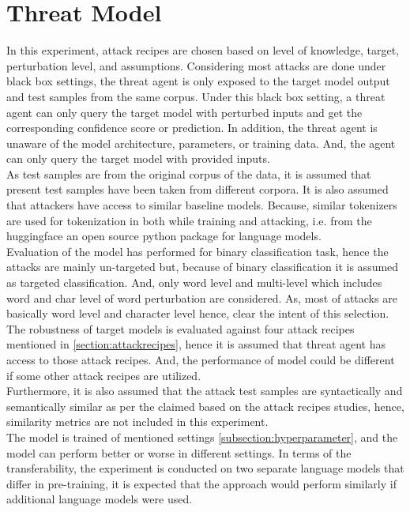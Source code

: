 \documentclass[%
	BCOR=8mm, %
	DIV=12,
	toc=bibliography, %
	toc=listof, %
	oneside, %
	egregdoesnotlikesansseriftitles, %
	]{scrbook}
\begin{document}
\section{Threat Model}
\label{section:threadmodel}
In this experiment, attack recipes are chosen based on level of knowledge, target, perturbation level, and assumptions. Considering most attacks are done under black box settings, the threat agent is only exposed to the target model output and test samples from the same corpus. Under this black box setting, a threat agent can only query the target model with perturbed inputs and get the corresponding confidence score or prediction. In addition, the threat agent is unaware of the model architecture, parameters, or training data. And, the agent can only query the target model with provided inputs. \\
As test samples are from the original corpus of the data, it is assumed that present test samples have been taken from different corpora. It is also assumed that attackers have access to similar baseline models. Because, similar tokenizers are used for tokenization in both while training and attacking, i.e. from the huggingface \cite{noauthor_hugging_nodate}  an open source python package for language models.\\
Evaluation of the model has performed for binary classification task, hence the attacks are mainly un-targeted but, because of binary classification it is assumed as targeted classification. And, only word level and multi-level which includes word and char level of word perturbation are considered. As, most of attacks are basically word level and character level hence, clear the intent of this selection.\\
The robustness of target models is evaluated against four attack recipes mentioned in \ref{section:attackrecipes}, hence it is assumed that threat agent has access to those attack recipes. And, the performance of model could be different if some other attack recipes are utilized.\\
 Furthermore, it is also assumed that the attack test samples are syntactically and semantically similar as per the claimed based on the attack recipes studies, hence, similarity metrics are not included in this experiment.\\
 The model is trained of mentioned settings  \ref{subsection:hyperparameter}, and the model can perform better or worse in different settings. In terms of the transferability, the experiment is conducted on two separate language models that differ in pre-training, it is expected that the approach would perform similarly if additional language models were used. 
\end{document}
